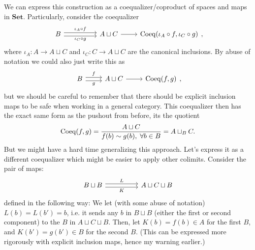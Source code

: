 \begin{solution}
    \begin{solution}
        We can express this construction as a coequalizer/coproduct of spaces and maps in $\textbf{Set}$. Particularly, consider the coequalizer 
        \[\begin{tikzcd}
	        B && {A\sqcup C} & {\Coeq(\iota_A\circ f, \iota_C\circ g)}
	        \arrow["{\iota_A\circ f}", shift left, from=1-1, to=1-3]
	        \arrow["{\iota_C\circ g}"', shift right, from=1-1, to=1-3]
	        \arrow[from=1-3, to=1-4]
        \end{tikzcd},\]
        where $\iota_A : A \to A\sqcup C$ and $\iota_C : C \to A\sqcup C$ are the canonical inclusions. By abuse of notation we could also just write this as 
        \[\begin{tikzcd}
	        B & {A\sqcup C} & {\Coeq(f, g)}
	        \arrow["{f}", shift left, from=1-1, to=1-2]
	        \arrow["{g}"', shift right, from=1-1, to=1-2]
	        \arrow[from=1-2, to=1-3]
        \end{tikzcd},\]
        but we should be careful to remember that there should be explicit inclusion maps to be safe when working in a general category. This coequalizer then has the exact same form as the pushout from before, its the quotient
        \[\mathrm{Coeq}(f,g) = \frac{A\sqcup C}{f(b) \sim g(b),\; \forall b\in B} = A\sqcup_B C.\]
        But we might have a hard time generalizing this approach. 
        Let's express it as a different coequalizer which might be easier to apply other colimits. Consider the pair of maps:
        \[\begin{tikzcd}
	        {B\sqcup B} && {A\sqcup C\sqcup B}
	        \arrow["L", shift left, from=1-1, to=1-3]
	        \arrow["K"', shift right, from=1-1, to=1-3]
        \end{tikzcd}\]
        defined in the following way: We let (with some abuse of notation) $L(b) = L(b') = b$, i.e. it sends any $b$ in $B\sqcup B$ (either the first or second component) to the $B$ in $A\sqcup C\sqcup B$. Then, let $K(b)=f(b)\in A$ for the first $B$, and $K(b')=g(b')\in B$ for the second $B$. (This can be expressed more rigorously with explicit inclusion maps, hence my warning earlier.)

\end{solution}
\end{solution}
